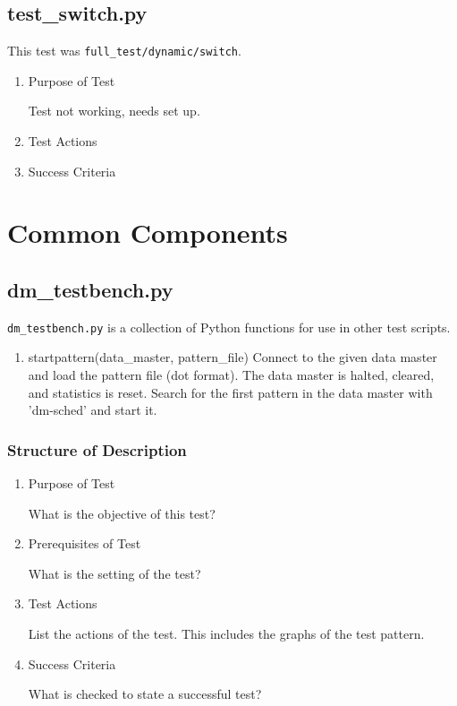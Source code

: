 \documentclass[12pt,a4paper]{report}
\begin{document}
\section{test\_switch.py}
This test was \texttt{full\_test/dynamic/switch}.
\begin{enumerate}
	\item Purpose of Test

	Test not working, needs set up.
	\item Test Actions
	\item Success Criteria
\end{enumerate}
\chapter{Common Components}
\section{dm\_testbench.py}
\texttt{dm\_testbench.py} is a collection of Python functions for use in other test scripts.
\begin{enumerate}
\item startpattern(data\_master, pattern\_file)
    Connect to the given data master and load the pattern file (dot format).
    The data master is halted, cleared, and statistics is reset.
    Search for the first pattern in the data master with 'dm-sched' and start it.
\end{enumerate}

\subsection{Structure of Description}
\begin{enumerate}
	\item Purpose of Test

	What is the objective of this test?
	\item Prerequisites of Test

	What is the setting of the test?
	\item Test Actions

	List the actions of the test. This includes the graphs of the test pattern.
	\item Success Criteria

	What is checked to state a successful test?
\end{enumerate}
\end{document}
